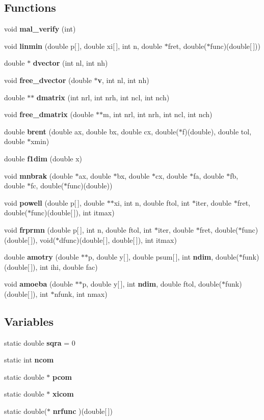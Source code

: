 \subsection*{Functions}
\begin{CompactItemize}
\item 
void {\bf mal\_\-verify} (int)
\item 
void {\bf linmin} (double p[$\,$], double xi[$\,$], int n, double $\ast$fret, double($\ast$func)(double[$\,$]))
\item 
double $\ast$ {\bf dvector} (int nl, int nh)
\item 
void {\bf free\_\-dvector} (double $\ast${\bf v}, int nl, int nh)
\item 
double $\ast$$\ast$ {\bf dmatrix} (int nrl, int nrh, int ncl, int nch)
\item 
void {\bf free\_\-dmatrix} (double $\ast$$\ast$m, int nrl, int nrh, int ncl, int nch)
\item 
double {\bf brent} (double ax, double bx, double cx, double($\ast$f)(double), double tol, double $\ast$xmin)
\item 
double {\bf f1dim} (double x)
\item 
void {\bf mnbrak} (double $\ast$ax, double $\ast$bx, double $\ast$cx, double $\ast$fa, double $\ast$fb, double $\ast$fc, double($\ast$func)(double))
\item 
void {\bf powell} (double p[$\,$], double $\ast$$\ast$xi, int n, double ftol, int $\ast$iter, double $\ast$fret, double($\ast$func)(double[$\,$]), int itmax)
\item 
void {\bf frprmn} (double p[$\,$], int n, double ftol, int $\ast$iter, double $\ast$fret, double($\ast$func)(double[$\,$]), void($\ast$dfunc)(double[$\,$], double[$\,$]), int itmax)
\item 
double {\bf amotry} (double $\ast$$\ast$p, double y[$\,$], double psum[$\,$], int {\bf ndim}, double($\ast$funk)(double[$\,$]), int ihi, double fac)
\item 
void {\bf amoeba} (double $\ast$$\ast$p, double y[$\,$], int {\bf ndim}, double ftol, double($\ast$funk)(double[$\,$]), int $\ast$nfunk, int nmax)
\end{CompactItemize}
\subsection*{Variables}
\begin{CompactItemize}
\item 
static double {\bf sqra} = 0
\item 
static int {\bf ncom}
\item 
static double $\ast$ {\bf pcom}
\item 
static double $\ast$ {\bf xicom}
\item 
static double($\ast$ {\bf nrfunc} )(double[$\,$])
\end{CompactItemize}


